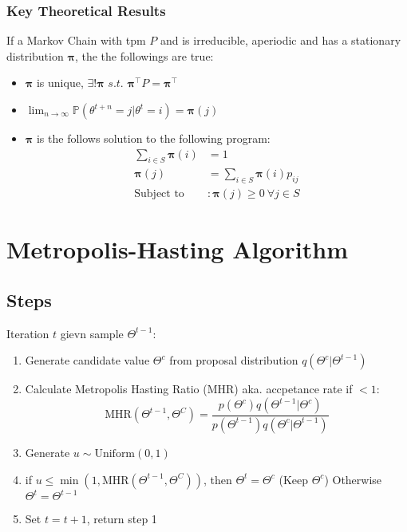 \documentclass[12pt]{article}
\theoremstyle{definition}
\newcommand{\suchthat}{\textit{ s.t. }}
\newcommand{\Prob}[1]{\mathbb{P}(#1)}
\begin{document}
        \subsubsection*{Key Theoretical Results}
        If a Markov Chain with tpm $P$ and is irreducible, aperiodic and has a stationary distribution $\bm{\pi}$, the the followings are true:
        \begin{itemize}
            \item $\bm{\pi}$ is unique, $\exists! \bm{\pi} \suchthat \bm{\pi}^\top P = \bm{\pi}^\top$
            \item $\lim_{n \rightarrow \infty} \Prob{\theta^{t+n} = j| \theta^t = i} = \bm{\pi}(j)$
            \item $\bm{\pi}$ is the follows solution to the following program:
                \begin{align*}
                    \sum_{i \in S} \bm{\pi}(i) &= 1\\
                    \bm{\pi}(j) &= \sum_{i \in S} \bm{\pi}(i)p_{ij}\\
                    \text{Subject to} &: \bm{\pi}(j) \geq 0 \ \forall j \in S
                \end{align*}
        \end{itemize}

\newpage
\section{Metropolis-Hasting Algorithm}
    \subsection*{Steps}
    Iteration $t$ gievn sample $\Theta^{t-1}$:
    \begin{enumerate}
        \item Generate candidate value $\Theta^c$ from proposal distribution $q(\Theta^c|\Theta^{t-1})$
        \item Calculate Metropolis Hasting Ratio (MHR) aka. accpetance rate if $< 1$:
        $$\text{MHR}(\Theta^{t-1}, \Theta^C) = \frac{p(\Theta^c)q(\Theta^{t-1}|\Theta^c)}{p(\Theta^{t-1})q(\Theta^c|\Theta^{t-1})}$$
        \item Generate $u \sim \text{Uniform}(0,1)$
        \item if $u \leq \min(1,\text{MHR}(\Theta^{t-1}, \Theta^C))$, then $\Theta^t = \Theta^c$ (Keep $\Theta^c$) Otherwise $\Theta^t = \Theta^{t-1}$
        \item Set $t = t+1$, return step 1
    \end{enumerate}
\end{document}

